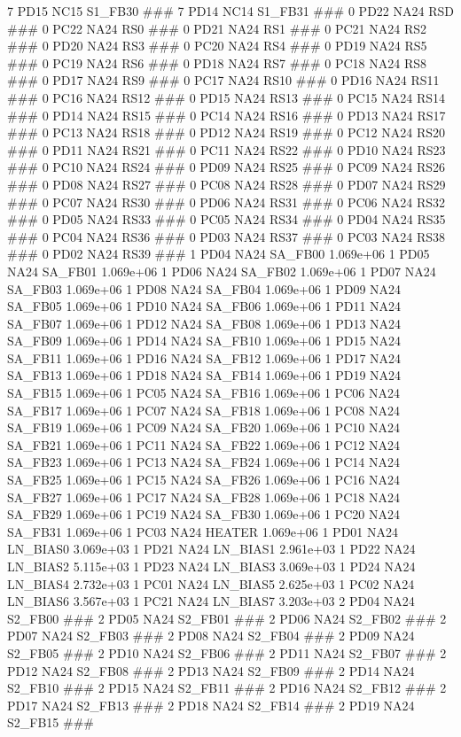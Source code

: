 7 PD15 NC15 S1_FB30 ### 
7 PD14 NC14 S1_FB31 ### 
0 PD22 NA24 RSD ### 
0 PC22 NA24 RS0 ### 
0 PD21 NA24 RS1 ### 
0 PC21 NA24 RS2 ### 
0 PD20 NA24 RS3 ### 
0 PC20 NA24 RS4 ### 
0 PD19 NA24 RS5 ### 
0 PC19 NA24 RS6 ### 
0 PD18 NA24 RS7 ### 
0 PC18 NA24 RS8 ### 
0 PD17 NA24 RS9 ### 
0 PC17 NA24 RS10 ### 
0 PD16 NA24 RS11 ### 
0 PC16 NA24 RS12 ### 
0 PD15 NA24 RS13 ### 
0 PC15 NA24 RS14 ### 
0 PD14 NA24 RS15 ### 
0 PC14 NA24 RS16 ### 
0 PD13 NA24 RS17 ### 
0 PC13 NA24 RS18 ### 
0 PD12 NA24 RS19 ### 
0 PC12 NA24 RS20 ### 
0 PD11 NA24 RS21 ### 
0 PC11 NA24 RS22 ### 
0 PD10 NA24 RS23 ### 
0 PC10 NA24 RS24 ### 
0 PD09 NA24 RS25 ### 
0 PC09 NA24 RS26 ### 
0 PD08 NA24 RS27 ### 
0 PC08 NA24 RS28 ### 
0 PD07 NA24 RS29 ### 
0 PC07 NA24 RS30 ### 
0 PD06 NA24 RS31 ### 
0 PC06 NA24 RS32 ### 
0 PD05 NA24 RS33 ### 
0 PC05 NA24 RS34 ### 
0 PD04 NA24 RS35 ### 
0 PC04 NA24 RS36 ### 
0 PD03 NA24 RS37 ### 
0 PC03 NA24 RS38 ### 
0 PD02 NA24 RS39 ### 
1 PD04 NA24 SA_FB00 1.069e+06 
1 PD05 NA24 SA_FB01 1.069e+06 
1 PD06 NA24 SA_FB02 1.069e+06 
1 PD07 NA24 SA_FB03 1.069e+06 
1 PD08 NA24 SA_FB04 1.069e+06 
1 PD09 NA24 SA_FB05 1.069e+06 
1 PD10 NA24 SA_FB06 1.069e+06 
1 PD11 NA24 SA_FB07 1.069e+06 
1 PD12 NA24 SA_FB08 1.069e+06 
1 PD13 NA24 SA_FB09 1.069e+06 
1 PD14 NA24 SA_FB10 1.069e+06 
1 PD15 NA24 SA_FB11 1.069e+06 
1 PD16 NA24 SA_FB12 1.069e+06 
1 PD17 NA24 SA_FB13 1.069e+06 
1 PD18 NA24 SA_FB14 1.069e+06 
1 PD19 NA24 SA_FB15 1.069e+06 
1 PC05 NA24 SA_FB16 1.069e+06 
1 PC06 NA24 SA_FB17 1.069e+06 
1 PC07 NA24 SA_FB18 1.069e+06 
1 PC08 NA24 SA_FB19 1.069e+06 
1 PC09 NA24 SA_FB20 1.069e+06 
1 PC10 NA24 SA_FB21 1.069e+06 
1 PC11 NA24 SA_FB22 1.069e+06 
1 PC12 NA24 SA_FB23 1.069e+06 
1 PC13 NA24 SA_FB24 1.069e+06 
1 PC14 NA24 SA_FB25 1.069e+06 
1 PC15 NA24 SA_FB26 1.069e+06 
1 PC16 NA24 SA_FB27 1.069e+06 
1 PC17 NA24 SA_FB28 1.069e+06 
1 PC18 NA24 SA_FB29 1.069e+06 
1 PC19 NA24 SA_FB30 1.069e+06 
1 PC20 NA24 SA_FB31 1.069e+06 
1 PC03 NA24 HEATER 1.069e+06 
1 PD01 NA24 LN_BIAS0 3.069e+03 
1 PD21 NA24 LN_BIAS1 2.961e+03 
1 PD22 NA24 LN_BIAS2 5.115e+03 
1 PD23 NA24 LN_BIAS3 3.069e+03 
1 PD24 NA24 LN_BIAS4 2.732e+03 
1 PC01 NA24 LN_BIAS5 2.625e+03 
1 PC02 NA24 LN_BIAS6 3.567e+03 
1 PC21 NA24 LN_BIAS7 3.203e+03 
2 PD04 NA24 S2_FB00 ### 
2 PD05 NA24 S2_FB01 ### 
2 PD06 NA24 S2_FB02 ### 
2 PD07 NA24 S2_FB03 ### 
2 PD08 NA24 S2_FB04 ### 
2 PD09 NA24 S2_FB05 ### 
2 PD10 NA24 S2_FB06 ### 
2 PD11 NA24 S2_FB07 ### 
2 PD12 NA24 S2_FB08 ### 
2 PD13 NA24 S2_FB09 ### 
2 PD14 NA24 S2_FB10 ### 
2 PD15 NA24 S2_FB11 ### 
2 PD16 NA24 S2_FB12 ### 
2 PD17 NA24 S2_FB13 ### 
2 PD18 NA24 S2_FB14 ### 
2 PD19 NA24 S2_FB15 ### 
